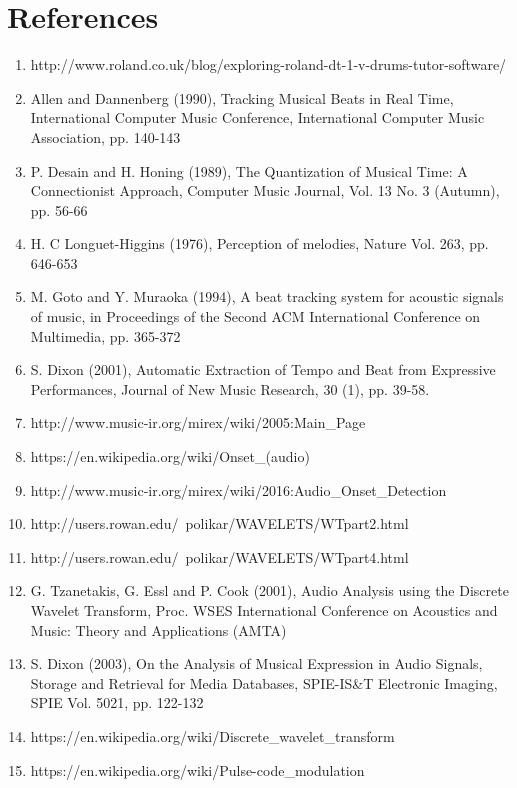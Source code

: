 \documentclass[a4paper, 11pt]{article}
\begin{document}
\maketitle{} 
\section{References}
\begin{enumerate}
\item http://www.roland.co.uk/blog/exploring-roland-dt-1-v-drums-tutor-software/ %
\item Allen and Dannenberg (1990), Tracking Musical Beats in Real Time, International Computer Music Conference, International Computer Music Association, pp. 140-143 %
\item P. Desain and H. Honing (1989), The Quantization of Musical Time: A Connectionist Approach, Computer Music Journal, Vol. 13 No. 3 (Autumn), pp. 56-66 %
\item H. C Longuet-Higgins (1976), Perception of melodies, Nature Vol. 263, pp. 646-653 %
\item M. Goto and Y. Muraoka (1994), A beat tracking system for acoustic signals of music, in Proceedings of the Second ACM International Conference on Multimedia, pp. 365-372 %
\item S. Dixon (2001), Automatic Extraction of Tempo and Beat from Expressive Performances, Journal of New Music Research, 30 (1), pp. 39-58. %
\item http://www.music-ir.org/mirex/wiki/2005:Main\_Page %
\item https://en.wikipedia.org/wiki/Onset\_(audio) %
\item http://www.music-ir.org/mirex/wiki/2016:Audio\_Onset\_Detection %
\item http://users.rowan.edu/~polikar/WAVELETS/WTpart2.html %
\item http://users.rowan.edu/~polikar/WAVELETS/WTpart4.html %
\item G. Tzanetakis, G. Essl and P. Cook (2001), Audio Analysis using the Discrete Wavelet Transform, Proc. WSES International Conference on Acoustics and Music: Theory and Applications (AMTA) %
\item S. Dixon (2003), On the Analysis of Musical Expression in Audio Signals, Storage and Retrieval for Media Databases, SPIE-IS\&T Electronic Imaging, SPIE Vol. 5021, pp. 122-132 %
\item https://en.wikipedia.org/wiki/Discrete\_wavelet\_transform %
\item https://en.wikipedia.org/wiki/Pulse-code\_modulation %

\end{enumerate}
\end{document}
